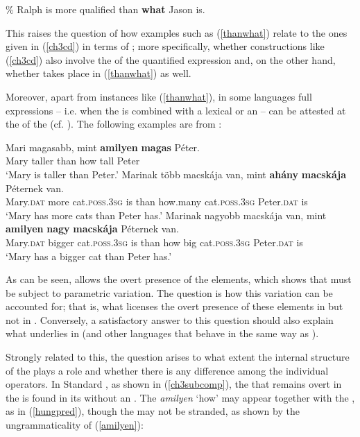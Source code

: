 \ea \% Ralph is more qualified than \textbf{what} Jason is.\label{thanwhat}
\z

This raises the question of how examples such as (\ref{thanwhat}) relate to the ones given in (\ref{ch3cd}) in terms of ; more specifically, whether constructions like (\ref{ch3cd}) also involve the  of the quantified expression and, on the other hand, whether  takes place in (\ref{thanwhat}) as well.

Moreover, apart from instances like (\ref{thanwhat}), in some languages full  expressions – i.e. when the  is combined with a lexical  or an  -- can be attested at the  of the  (cf. \citealt{kenesei1992}). The following examples are from :

\ea \label{hungarian}
\ea \gll Mari magasabb, mint \textbf{amilyen} \textbf{magas} P\'eter.\label{hungpred}\\
Mary taller than how tall Peter\\
\glt `Mary is taller than Peter.'
\ex \gll Marinak t\"{o}bb macsk\'aja van, mint \textbf{ah\'any} \textbf{macsk\'aja} P\'eternek van.\\
Mary.\textsc{dat} more cat.\textsc{poss.3sg} is than how.many cat.\textsc{poss.3sg} Peter.\textsc{dat} is\\
\glt `Mary has more cats than Peter has.'
\ex \gll Marinak nagyobb macsk\'aja van, mint \textbf{amilyen} \textbf{nagy} \textbf{macsk\'aja} P\'eternek van.\\
Mary.\textsc{dat} bigger cat.\textsc{poss.3sg} is than how big	cat.\textsc{poss.3sg} Peter.\textsc{dat} is\\
\glt `Mary has a bigger cat than Peter has.'
\z
\z

As can be seen,  allows the overt presence of the  elements, which shows that  must be subject to parametric variation. The question is how this variation can be accounted for; that is, what licenses the overt presence of these elements in  but not in . Conversely, a satisfactory answer to this question should also explain what underlies  in  (and other languages that behave in the same way as ).

Strongly related to this, the question arises to what extent the internal structure of the  plays a role and whether there is any difference among the individual operators. In Standard , as shown in (\ref{ch3subcomp}), the  that remains overt in the  is found in its  without an . The   \textit{amilyen} `how' may appear together with the , as in (\ref{hungpred}), though the  may not be stranded, as shown by the ungrammaticality of (\ref{amilyen}):

